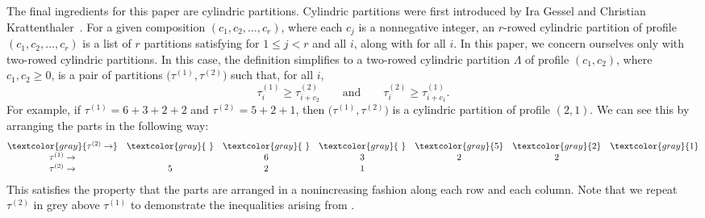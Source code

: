 \documentclass[10pt,a4paper]{amsart}
\numberwithin{equation}{section}
\theoremstyle{definition}
\begin{document}
The final ingredients for this paper are cylindric partitions. Cylindric partitions were first introduced by Ira Gessel and Christian Krattenthaler~\cite{GesKra}. For a given composition $(c_1,c_2,\dots,c_r)$, where each $c_j$ is a nonnegative integer, an $r$-rowed cylindric partition of profile $(c_1,c_2,\dots,c_r)$ is a list of $r$ partitions  satisfying  for $1\le j <r$ and all $i$, along with  for all $i$. In this paper, we concern ourselves only with two-rowed cylindric partitions. In this case, the definition simplifies to a two-rowed cylindric partition $\Lambda$ of profile $(c_1,c_2)$, where $c_1,c_2\ge0$, is a pair of partitions $\bigl(\tau^{(1)},\tau^{(2)}\bigr)$ such that, for all $i$,
\begin{equation*}
\tau_i^{(1)} \ge \tau_{i+c_2}^{(2)} \qquad \text{and} \qquad \tau_i^{(2)} \ge \tau_{i+c_1}^{(1)}.
\end{equation*}
For example, if $\tau^{(1)}=6+3+2+2$ and $\tau^{(2)}=5+2+1$, then $\bigl(\tau^{(1)},\tau^{(2)}\bigr)$ is a cylindric partition of profile $(2,1)$. We can see this by arranging the parts in the following way:
\begin{equation*}
\begin{matrix}
\textcolor{gray}{\tau^{(2)} \rightarrow } & \textcolor{gray}{\text{ }}& \textcolor{gray}{\text{ }}& \textcolor{gray}{\text{ }}&\textcolor{gray}{5} & \textcolor{gray}{2} & \textcolor{gray}{1} \\
\tau^{(1)} \rightarrow & \text{ }& 6 & 3 & 2 &2 \\
\tau^{(2)} \rightarrow & 5& 2 & 1
\end{matrix}
\end{equation*}
This satisfies the property that the parts are arranged in a nonincreasing fashion along each row and each column.
Note that we repeat $\tau^{(2)}$ in grey above $\tau^{(1)}$ to demonstrate the inequalities arising from .
\end{document}
